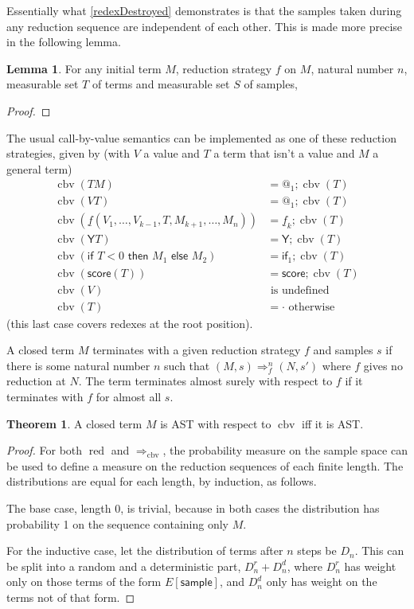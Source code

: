 \documentclass{article}
\newcommand{\tY}{\textsf{Y}}
\newcommand{\tif}[3]{\textsf{if }#1\textsf{ then }#2\textsf{ else }#3}
\newcommand{\tsample}{\textsf{sample}}
\newcommand{\tscore}{\textsf{score}}
\DeclareMathOperator{\red}{red}
\DeclareMathOperator{\cbv}{cbv}
\theoremstyle{definition}
\theoremstyle{lemma}
\newtheorem{lemma}{Lemma}
\newtheorem{theorem}{Theorem}
\theoremstyle{remark}
\begin{document}
Essentially what \ref{redexDestroyed} demonstrates is that the samples taken during any reduction sequence are independent of each other. This is made more precise in the following lemma.

\begin{lemma}
For any initial term $M$, reduction strategy $f$ on $M$, natural number $n$, measurable set $T$ of terms and measurable set $S$ of samples, 
\end{lemma}
\begin{proof}
\end{proof}

The usual call-by-value semantics can be implemented as one of these reduction strategies, given by (with $V$ a value and $T$ a term that isn't a value and $M$ a general term)
\begin{align*}
\cbv(T M) & = @_1 ; \cbv(T) \\
\cbv(V T) & = @_1 ; \cbv(T) \\
\cbv(\underline f(V_1, \dots, V_{k-1}, T, M_{k+1}, \dots, M_n)) & = \underline f_k ; \cbv(T) \\
\cbv(\tY T) & = \tY ; \cbv(T) \\
\cbv(\tif{T < 0}{M_1}{M_2}) & = \textsf{if}_1 ; \cbv(T) \\
\cbv(\tscore(T)) & = \tscore ; \cbv(T) \\
\cbv(V) & \text{ is undefined} \\
\cbv(T) & = \cdot \text{ otherwise}
\end{align*}
(this last case covers redexes at the root position).

A closed term $M$ terminates with a given reduction strategy $f$ and samples $s$ if there is some natural number $n$ such that $(M,s) \Rightarrow_f^n (N,s')$ where $f$ gives no reduction at $N$. The term terminates almost surely with respect to $f$ if it terminates with $f$ for almost all $s$.

\begin{theorem} \label{AstEquivalence}
A closed term $M$ is AST with respect to $\cbv$ iff it is AST.
\end{theorem}
\begin{proof}
For both $\red$ and $\Rightarrow_{\cbv}$, the probability measure on the sample space can be used to define a measure on the reduction sequences of each finite length. The distributions are equal for each length, by induction, as follows.

The base case, length 0, is trivial, because in both cases the distribution has probability 1 on the sequence containing only $M$.

For the inductive case, let the distribution of terms after $n$ steps be $D_n$. This can be split into a random and a deterministic part, $D_n^r + D_n^d$, where $D_n^r$ has weight only on those terms of the form $E[\tsample]$, and $D_n^d$ only has weight on the terms not of that form. 
\end{proof}
\end{document}
